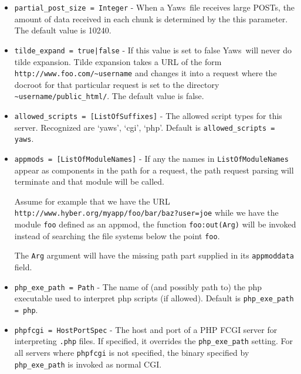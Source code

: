 \documentclass[11pt,oneside,english]{book}
\newcommand{\Yaws}            %
        {{\sc Yaws}}
\begin{document}
\begin{itemize}
\item       \verb+partial_post_size = Integer+ -
              When a \Yaws\  file receives large  POSTs,  the
              amount  of  data  received  in each chunk is
              determined by the this parameter.  The default
              value is 10240.

\item       \verb+tilde_expand = true|false+ -
              If  this  value  is  set  to false \Yaws\  will
              never do tilde  expansion.  Tilde expansion takes a URL
              of the form \verb+http://www.foo.com/~username+ and
              changes it into a request where the docroot for that
              particular request is set to the directory
              \verb+~username/public_html/+. The default value is
              false.

\item       \verb+allowed_scripts = [ListOfSuffixes]+ -
              The allowed script types for this server.  Recognized
              are `yaws', `cgi', `php'.  Default is
              \verb+allowed_scripts = yaws+.

\item       \verb+appmods = [ListOfModuleNames]+ -
              If any the names in \verb+ListOfModuleNames+ appear
              as components in the path for a request, the
              path request parsing will terminate and that
              module will be called.

              Assume  for  example  that  we  have  the  URL
              \verb+http://www.hyber.org/myapp/foo/bar/baz?user=joe+
              while we have the module \verb+foo+ defined  as  an
              appmod,  the  function  \verb+foo:out(Arg)+ will be
              invoked instead of searching the file systems
              below the point \verb+foo+.

              The \verb+Arg+ argument will have the missing path
              part supplied in its \verb+appmoddata+ field.

\item       \verb+php_exe_path = Path+ -
              The name of (and possibly path to) the php executable
	      used to interpret php scripts (if allowed).  Default is
	      \verb+php_exe_path = php+.

\item       \verb+phpfcgi = HostPortSpec+ -
              The host and port of a PHP FCGI server for interpreting
              \verb+.php+ files. If specified, it overrides the
              \verb+php_exe_path+ setting. For all servers where
              \verb+phpfcgi+ is not specified, the binary specified by
              \verb+php_exe_path+ is invoked as normal CGI.


\end{itemize}
\end{document}
